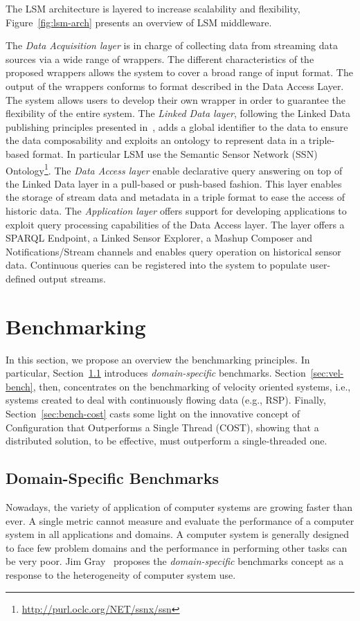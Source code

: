 The LSM architecture is layered to increase scalability and flexibility, Figure~\ref{fig:lsm-arch} presents an overview of LSM middleware.

The \textit{Data Acquisition layer} is in charge of collecting data from streaming data sources via a wide range of wrappers. The different characteristics of the proposed wrappers allows the system to cover a broad range of input format. The output of the wrappers conforms to format described in the Data Access Layer. The system allows users to develop their own wrapper in order to guarantee the flexibility of the entire system.
The \textit{Linked Data layer},  following the Linked Data publishing principles presented in~\cite{DBLP:series/synthesis/2011Heath},  adds a global identifier to the data to ensure the data composability and exploits an ontology to represent data in a triple-based format. In particular LSM use the Semantic Sensor Network (SSN) Ontology\footnote{\url{http://purl.oclc.org/NET/ssnx/ssn}}.
The \textit{Data Access layer} enable declarative query answering on top of the Linked Data layer  in a pull-based or push-based fashion. This layer enables the storage of stream data and metadata in a triple format to ease the access of historic data.
The \textit{Application layer} offers support for developing applications to exploit query processing capabilities of the Data Access layer. The layer offers a SPARQL Endpoint, a Linked Sensor Explorer, a Mashup Composer and Notifications/Stream channels and enables query operation on historical sensor data. Continuous queries can be registered into the system to populate user-defined output streams.

\section{Benchmarking}\label{sec:benchmarking}
In this section, we propose an overview the benchmarking principles. In particular, Section~\ref{sec:dsb} introduces \textit{domain-specific} benchmarks. Section~\ref{sec:vel-bench}, then, concentrates on the benchmarking of velocity oriented systems, i.e., systems created to deal with continuously flowing data (e.g., RSP). Finally, Section~\ref{sec:bench-cost} casts some light on the innovative concept of Configuration that Outperforms a Single Thread (COST), showing that a distributed solution, to be effective, must outperform a single-threaded one.


\subsection{Domain-Specific Benchmarks}\label{sec:dsb}
Nowadays, the variety of application of computer systems are growing faster than ever.
A single metric cannot measure and evaluate the performance of a computer system in all applications and domains.
A computer system is generally designed to face few problem domains and the performance in performing other tasks can be very poor.
Jim Gray~\cite{gray1992benchmark} proposes the \textit{domain-specific} benchmarks concept as a response to the heterogeneity of computer system use. 

